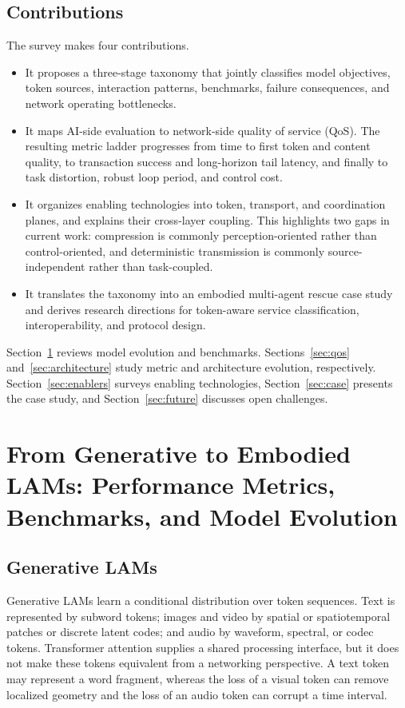 \documentclass[letterpaper,journal]{IEEEtran}
\begin{document}
\subsection{Contributions}
The survey makes four contributions.

\begin{itemize}
\item It proposes a three-stage taxonomy that jointly classifies model
objectives, token sources, interaction patterns, benchmarks, failure
consequences, and network operating bottlenecks.
\item It maps AI-side evaluation to network-side quality of service (QoS).
The resulting metric ladder progresses from time to first token and content
quality, to transaction success and long-horizon tail latency, and finally to
task distortion, robust loop period, and control cost.
\item It organizes enabling technologies into token, transport, and
coordination planes, and explains their cross-layer coupling. This highlights
two gaps in current work: compression is commonly perception-oriented rather
than control-oriented, and deterministic transmission is commonly
source-independent rather than task-coupled.
\item It translates the taxonomy into an embodied multi-agent rescue case
study and derives research directions for token-aware service classification,
interoperability, and protocol design.
\end{itemize}

Section~\ref{sec:model_evolution} reviews model evolution and benchmarks.
Sections~\ref{sec:qos} and~\ref{sec:architecture} study metric and architecture
evolution, respectively. Section~\ref{sec:enablers} surveys enabling
technologies, Section~\ref{sec:case} presents the case study, and
Section~\ref{sec:future} discusses open challenges.

\section{From Generative to Embodied LAMs: Performance Metrics, Benchmarks, and Model Evolution}
\label{sec:model_evolution}

\subsection{Generative LAMs}
Generative LAMs learn a conditional distribution over token sequences.
Text is represented by subword tokens; images and video by spatial or
spatiotemporal patches or discrete latent codes; and audio by waveform,
spectral, or codec tokens. Transformer attention supplies a shared processing
interface, but it does not make these tokens equivalent from a networking
perspective. A text token may represent a word fragment, whereas the loss of a
visual token can remove localized geometry and the loss of an audio token can
corrupt a time interval.
\end{document}
